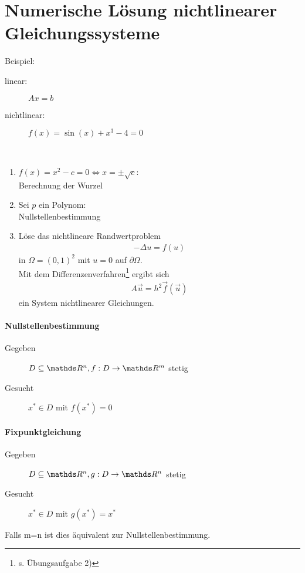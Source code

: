 % 
% 
% 
% 


\chapter{Numerische Lösung nichtlinearer Gleichungssysteme}
Beispiel:
\begin{description}
\item[linear:] $Ax=b$
\item[nichtlinear:] $f(x) = \sin(x) +x^3-4=0$
\end{description}

\begin{Bspe}~
  \begin{enumerate}[1)]
  \item $f(x) = x^2-c = 0 \Leftrightarrow x= \pm \sqrt{c}$: \\Berechnung der Wurzel
  \item Sei $p$ ein Polynom:\\ Nullstellenbestimmung
  \item Löse das nichtlineare Randwertproblem
    \begin{gather*}
      -\Delta u = f(u)
    \end{gather*}
    in $\Omega=(0,1)^2$ mit $u=0$ auf $\partial \Omega$. \\
    Mit dem Differenzenverfahren\footnote{s. Übungsaufgabe 2)}
    ergibt sich
    \begin{gather*}
      A\vec{u} = h^2 \vec{f}(\vec{u})
    \end{gather*}
    ein System nichtlinearer Gleichungen.
  \end{enumerate}
\end{Bspe}

\subsubsection{Nullstellenbestimmung}
\begin{description}
\item[Gegeben]   $D\subseteq \R^n, f: D\rightarrow \R^m$ stetig
\item[Gesucht]    $x^{*}\in D $ mit $f(x^{*}) = 0$
\end{description}

\subsubsection{Fixpunktgleichung}
\begin{description}
\item[Gegeben]   $D\subseteq \R^n, g: D\rightarrow \R^n$ stetig
\item[Gesucht]      $x^{*}\in D $ mit $g(x^{*}) = x^{*}$
\end{description}
Falls m=n ist dies äquivalent zur Nullstellenbestimmung.

